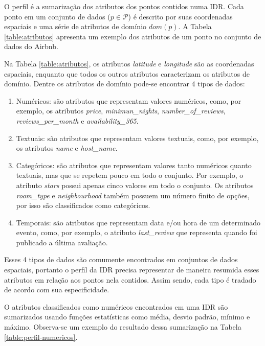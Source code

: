 O perfil é a sumarização dos atributos dos pontos contidos numa IDR. Cada ponto em um conjunto de dados ($p \in \mathcal{P}$) é descrito por suas coordenadas espaciais e uma série de atributos de domínio $dom(p)$. A Tabela \ref{table:atributos} apresenta um exemplo dos atributos de um ponto no conjunto de dados do Airbnb.

Na Tabela \ref{table:atributos}, os atributos {\em latitude} e {\em longitude} são as coordenadas espaciais, enquanto que todos os outros atributos caracterizam os atributos de domínio. Dentre os atributos de domínio pode-se encontrar 4 tipos de dados:

\begin{enumerate}
	\item Numéricos: são atributos que representam valores numéricos, como, por exemplo, os atributos {\em price}, {\em minimun\_nights}, {\em number\_of\_reviews}, {\em reviews\_per\_month} e {\em availability\_365}.
	\item Textuais: são atributos que representam valores textuais, como, por exemplo, os atributos {\em name} e {\em host\_name}.
	\item Categóricos: são atributos que representam valores tanto numéricos quanto textuais, mas que se repetem pouco em todo o conjunto. Por exemplo, o atributo {\em stars} possui apenas cinco valores em todo o conjunto. Os atributos {\em room\_type} e {\em neighbourhood} também possuem um número finito de opções, por isso são classificados como categóricos.
	\item Temporais: são atributos que representam data e/ou hora de um determinado evento, como, por exemplo, o atributo {\em last\_review} que representa quando foi publicado a última avaliação.
\end{enumerate}

Esses 4 tipos de dados são comumente encontrados em conjuntos de dados espaciais, portanto o perfil da IDR precisa representar de maneira resumida esses atributos em relação aos pontos nela contidos. Assim sendo, cada tipo é tradado de acordo com sua especificidade.

O atributos classificados como numéricos encontrados em uma IDR são sumarizados usando funções estatísticas como média, desvio padrão, mínimo e máximo. Observa-se um exemplo do resultado dessa sumarização na Tabela \ref{table:perfil-numericos}.

